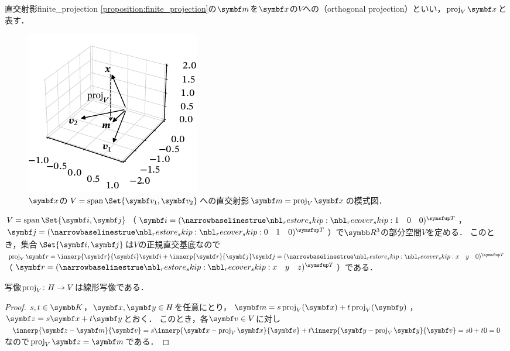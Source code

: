 \documentclass[../../main]{subfiles}
\begin{document}
\begin{definition}{直交射影}{finite_projection}
  \cref{proposition:finite_projection}の\(\vect{m}\)を\(\vect{x}\)の\(V\)への（orthogonal projection）といい，\(\proj_V\vect{x}\)と表す．
\end{definition}

\begin{figure}[htbp]
  \centering
  \includegraphics{figures/proj3d.pdf}
  \caption{\(\vect{x}\)の\(V=\spannedby\Set{\vect{v}_1,\vect{v}_2}\)への直交射影\(\vect{m}=\proj_V\vect{x}\)の模式図．}
\end{figure}

\begin{example}
  \(V=\spannedby\Set{\vect{i},\vect{j}}\)（\(\vect{i}=\trps{\rowvect{1 & 0 & 0}}\)，\(\vect{j}=\trps{\rowvect{0 & 1 & 0}}\)）で\(\numset{R}^3\)の部分空間\(V\)を定める．
  このとき，集合\(\Set{\vect{i},\vect{j}}\)は\(V\)の正規直交基底なので\(\proj_V\vect{r}=\innerp{\vect{r}}{\vect{i}}\vect{i}+\innerp{\vect{r}}{\vect{j}}\vect{j}=\trps{\rowvect{x & y & 0}}\)（\(\vect{r}=\trps{\rowvect{x & y & z}}\)）である．
\end{example}

\begin{proposition}{}{}
  写像\(\operatorname{proj}_V\colon H\to V\)は線形写像である．
\end{proposition}

\begin{proof}
  \(s,t\in\numset{K}\)，\(\vect{x},\vect{y}\in H\)を任意にとり，\(\vect{m}=s\proj_V(\vect{x})+t\proj_V(\vect{y})\)，\(\vect{z}=s\vect{x}+t\vect{y}\)とおく．
  このとき，各\(\vect{v}\in V\)に対し\(\innerp{\vect{z}-\vect{m}}{\vect{v}}=s\innerp{\vect{x}-\proj_V\vect{x}}{\vect{v}}+t\innerp{\vect{y}-\proj_V\vect{y}}{\vect{v}}=s0+t0=0\)なので\(\proj_V\vect{z}=\vect{m}\)である．
\end{proof}
\end{document}
